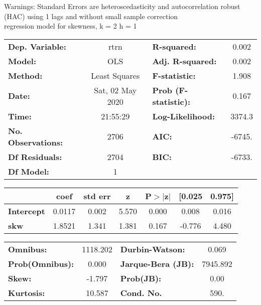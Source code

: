 Warnings: \newline
 [1] Standard Errors are heteroscedasticity and autocorrelation robust (HAC) using 1 lags and without small sample correction\\ 

regression model for skewness, k = 2 h = 1\begin{center}
\begin{tabular}{lclc}
\toprule
\textbf{Dep. Variable:}    &       rtrn       & \textbf{  R-squared:         } &     0.002   \\
\textbf{Model:}            &       OLS        & \textbf{  Adj. R-squared:    } &     0.002   \\
\textbf{Method:}           &  Least Squares   & \textbf{  F-statistic:       } &     1.908   \\
\textbf{Date:}             & Sat, 02 May 2020 & \textbf{  Prob (F-statistic):} &    0.167    \\
\textbf{Time:}             &     21:55:29     & \textbf{  Log-Likelihood:    } &    3374.3   \\
\textbf{No. Observations:} &        2706      & \textbf{  AIC:               } &    -6745.   \\
\textbf{Df Residuals:}     &        2704      & \textbf{  BIC:               } &    -6733.   \\
\textbf{Df Model:}         &           1      & \textbf{                     } &             \\
\bottomrule
\end{tabular}
\begin{tabular}{lcccccc}
                   & \textbf{coef} & \textbf{std err} & \textbf{z} & \textbf{P$> |$z$|$} & \textbf{[0.025} & \textbf{0.975]}  \\
\midrule
\textbf{Intercept} &       0.0117  &        0.002     &     5.570  &         0.000        &        0.008    &        0.016     \\
\textbf{skw}       &       1.8521  &        1.341     &     1.381  &         0.167        &       -0.776    &        4.480     \\
\bottomrule
\end{tabular}
\begin{tabular}{lclc}
\textbf{Omnibus:}       & 1118.202 & \textbf{  Durbin-Watson:     } &    0.069  \\
\textbf{Prob(Omnibus):} &   0.000  & \textbf{  Jarque-Bera (JB):  } & 7945.892  \\
\textbf{Skew:}          &  -1.797  & \textbf{  Prob(JB):          } &     0.00  \\
\textbf{Kurtosis:}      &  10.587  & \textbf{  Cond. No.          } &     590.  \\
\bottomrule
\end{tabular}
\end{center}

